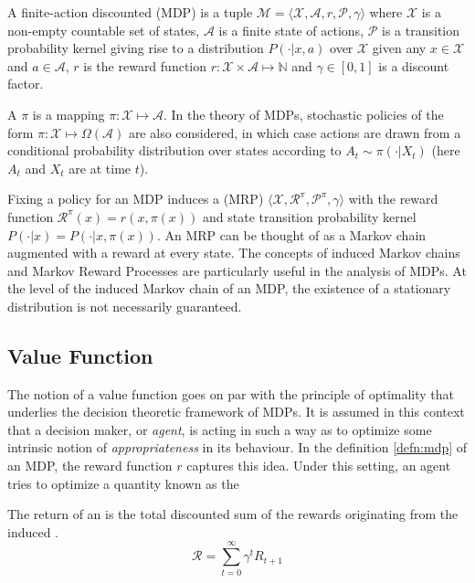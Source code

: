 \begin{defn}
\label{defn:mdp}
A finite-action discounted  (MDP) is a tuple
$\mathcal{M} = \langle \mathcal{X}, \mathcal{A}, r, \mathcal{P},\gamma \rangle$ where
$\mathcal{X}$ is a non-empty countable set of states, $\mathcal{A}$ is a finite state
of actions, $\mathcal{P}$ is a transition probability kernel giving rise to a distribution
$P(\cdot |x, a)$ over $\mathcal{X}$ given any $x \in \mathcal{X}$ and $a \in
\mathcal{A}$,  $r$ is the reward function $r: \mathcal{X} \times \mathcal{A} \mapsto
\mathbb{N}$ and $\gamma \in [0, 1]$ is a discount factor.
\end{defn}

A  $\pi$ is a mapping $\pi : \mathcal{X} \mapsto
\mathcal{A}$. In the theory of MDPs, stochastic policies of the form $\pi : \mathcal{X}
\mapsto \Omega(\mathcal{A})$ are also considered, in which case actions are
drawn from a conditional probability distribution  over states according to $A_t \sim
\pi(\cdot | X_t)$ (here $A_t$ and $X_t$ are \rvs at time $t$). 

Fixing a policy for an MDP  induces a 
(MRP) $\langle \mathcal{X}, \mathcal{R}^\pi, \mathcal{P}^\pi, \gamma \rangle$ with
the reward function $\mathcal{R}^\pi(x) = r(x, \pi(x))$ and state transition probability
kernel $P(\cdot | x) = P(\cdot | x, \pi(x))$. An MRP can be thought of as a Markov chain
augmented with a reward at every state. The concepts of induced Markov
chains and Markov Reward Processes are particularly useful in the analysis of 
MDPs. At the level of the induced Markov chain of an MDP, the
existence of a stationary distribution is not necessarily guaranteed.

\subsection{Value Function}
The notion of a value function goes on par with the principle of optimality
that underlies the decision theoretic framework of MDPs. It is assumed in this context
that a decision maker, or \textit{agent}, is acting in such a way as to optimize some
intrinsic notion of \textit{appropriateness} in its behaviour. In the definition \ref{defn:mdp}
of an MDP, the reward function $r$ captures this idea. Under this setting, an agent  tries to optimize a quantity known as the 

\begin{defn}
The return of an \mdp is the total discounted sum of the rewards originating from
the induced \mrp.
\begin{equation}
\mathcal{R} = \sum_{t=0}^\infty \gamma^t R_{t+1} \label{eq:return}
\end{equation}
\end{defn}

